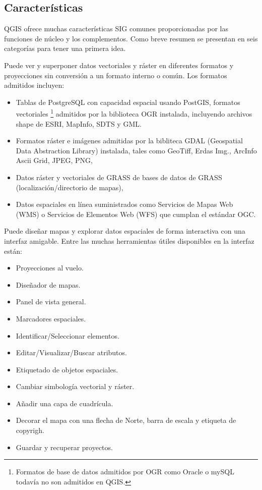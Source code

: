 \subsection{Características}\label{label_majfeat}

QGIS ofrece muchas características SIG comunes proporcionadas por las funciones de núcleo y
los complementos. Como breve resumen se presentan en seis categorías para tener una 
primera idea.


Puede ver y superponer datos vectoriales y ráster en diferentes formatos y
proyecciones sin conversión a un formato interno o común. Los formatos
admitidos incluyen:

\begin{itemize}
\item Tablas de PostgreSQL con capacidad espacial usando PostGIS, formatos vectoriales
\footnote{Formatos de base de datos admitidos por OGR como Oracle o mySQL todavía no son
admitidos en QGIS.} admitidos por la biblioteca OGR instalada, incluyendo archivos shape
de ESRI, MapInfo, SDTS y GML.
\item Formatos ráster e imágenes admitidas por la bibliteca GDAL (Geospatial
Data Abstraction Library) instalada, tales como 
GeoTiff, Erdas Img., ArcInfo Ascii Grid, JPEG, PNG,
\item Datos ráster y vectoriales de GRASS de bases de datos de GRASS (localización/directorio de mapas), 
\item Datos espaciales en línea suministrados como Servicios de Mapas Web (WMS) o
Servicios de Elementos Web (WFS) que cumplan el estándar OGC.
\end{itemize}


Puede diseñar mapas y explorar datos espaciales de forma interactiva con una interfaz
amigable. Entre las muchas herramientas útiles disponibles en la interfaz están:

\begin{itemize}
\item Proyecciones al vuelo.
\item Diseñador de mapas.
\item Panel de vista general.
\item Marcadores espaciales.
\item Identificar/Seleccionar elementos.
\item Editar/Visualizar/Buscar atributos.
\item Etiquetado de objetos espaciales.
\item Cambiar simbología vectorial y ráster.
\item Añadir una capa de cuadrícula.
\item Decorar el mapa con una flecha de Norte, barra de escala y etiqueta de copyrigh.
\item Guardar y recuperar proyectos.
\end{itemize}

